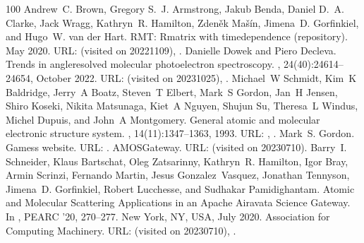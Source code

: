 \documentclass[letterpaper,table,10pt,english]{jupyterBook}
\begin{document}
\begin{sphinxthebibliography}{100}
\sphinxAtStartPar
Andrew C. Brown, Gregory S. J. Armstrong, Jakub Benda, Daniel D. A. Clarke, Jack Wragg, Kathryn R. Hamilton, Zdeněk Mašín, Jimena D. Gorfinkiel, and Hugo W. van der Hart. RMT: R\sphinxhyphen{}matrix with time\sphinxhyphen{}dependence (repository). May 2020. URL:  (visited on 2022\sphinxhyphen{}11\sphinxhyphen{}09), .
\sphinxAtStartPar
Danielle Dowek and Piero Decleva. Trends in angle\sphinxhyphen{}resolved molecular photoelectron spectroscopy. , 24(40):24614–24654, October 2022. URL:  (visited on 2023\sphinxhyphen{}10\sphinxhyphen{}25), .
\sphinxAtStartPar
Michael W Schmidt, Kim K Baldridge, Jerry A Boatz, Steven T Elbert, Mark S Gordon, Jan H Jensen, Shiro Koseki, Nikita Matsunaga, Kiet A Nguyen, Shujun Su, Theresa L Windus, Michel Dupuis, and John A Montgomery. General atomic and molecular electronic structure system. , 14(11):1347–1363, 1993. URL: , .
\sphinxAtStartPar
Mark S. Gordon. Gamess website. URL: .
\sphinxAtStartPar
AMOSGateway. URL:  (visited on 2023\sphinxhyphen{}07\sphinxhyphen{}10).
\sphinxAtStartPar
Barry I. Schneider, Klaus Bartschat, Oleg Zatsarinny, Kathryn R. Hamilton, Igor Bray, Armin Scrinzi, Fernando Martin, Jesus Gonzalez Vasquez, Jonathan Tennyson, Jimena D. Gorfinkiel, Robert Lucchesse, and Sudhakar Pamidighantam. Atomic and Molecular Scattering Applications in an Apache Airavata Science Gateway. In , PEARC '20, 270–277. New York, NY, USA, July 2020. Association for Computing Machinery. URL:  (visited on 2023\sphinxhyphen{}07\sphinxhyphen{}10), .

\end{sphinxthebibliography}
\end{document}
